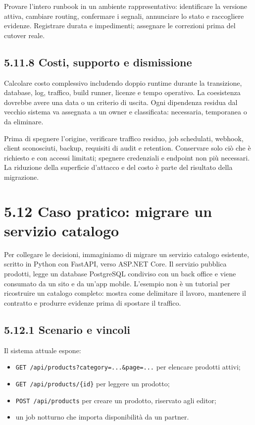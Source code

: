 \documentclass[
  italian,
  10pt,
]{book}
\providecommand{\tightlist}{%
  \setlength{\itemsep}{0pt}\setlength{\parskip}{0pt}}
\begin{document}
Provare l'intero runbook in un ambiente rappresentativo: identificare la
versione attiva, cambiare routing, confermare i segnali, annunciare lo
stato e raccogliere evidenze. Registrare durata e impedimenti; assegnare
le correzioni prima del cutover reale.

\subsection{5.11.8 Costi, supporto e
dismissione}\label{costi-supporto-e-dismissione}

Calcolare costo complessivo includendo doppio runtime durante la
transizione, database, log, traffico, build runner, licenze e tempo
operativo. La coesistenza dovrebbe avere una data o un criterio di
uscita. Ogni dipendenza residua dal vecchio sistema va assegnata a un
owner e classificata: necessaria, temporanea o da eliminare.

Prima di spegnere l'origine, verificare traffico residuo, job
schedulati, webhook, client sconosciuti, backup, requisiti di audit e
retention. Conservare solo ciò che è richiesto e con accessi limitati;
spegnere credenziali e endpoint non più necessari. La riduzione della
superficie d'attacco e del costo è parte del risultato della migrazione.

\section{5.12 Caso pratico: migrare un servizio
catalogo}\label{caso-pratico-migrare-un-servizio-catalogo}

Per collegare le decisioni, immaginiamo di migrare un servizio catalogo
esistente, scritto in Python con FastAPI, verso ASP.NET Core. Il
servizio pubblica prodotti, legge un database PostgreSQL condiviso con
un back office e viene consumato da un sito e da un'app mobile.
L'esempio non è un tutorial per ricostruire un catalogo completo: mostra
come delimitare il lavoro, mantenere il contratto e produrre evidenze
prima di spostare il traffico.

\subsection{5.12.1 Scenario e vincoli}\label{scenario-e-vincoli}

Il sistema attuale espone:

\begin{itemize}
\tightlist
\item
  \texttt{GET\ /api/products?category=...\&page=...} per elencare
  prodotti attivi;
\item
  \texttt{GET\ /api/products/\{id\}} per leggere un prodotto;
\item
  \texttt{POST\ /api/products} per creare un prodotto, riservato agli
  editor;
\item
  un job notturno che importa disponibilità da un partner.
\end{itemize}
\end{document}
